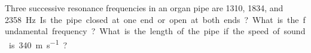\documentclass{../oss-apphys-exam}
\begin{document}
\begin{questions}

  \question Three successive resonance frequencies in an organ pipe are 1310,
  1834, and \SI{2358}\hertz. Is the pipe closed at one end or open at both
  ends? What is the fundamental frequency? What is the length of the pipe if the
  speed of sound is \SI{340}{\metre\per\second}?
  \vspace{\stretch3}
  



\end{questions}
\end{document}

